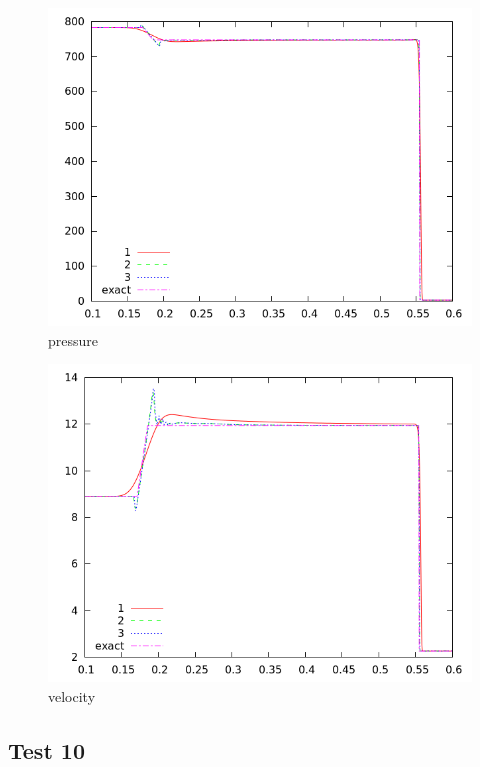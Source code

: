 \documentclass[10pt,preprint]{aastex}
\begin{document}
\begin{figure}
  \begin{center}
     \includegraphics[width=.78\textwidth]{prs_T9.png}	
  \end{center}
  \caption{pressure}
\end{figure}

\begin{figure}
  \begin{center}
     \includegraphics[width=.78\textwidth]{vel_T9.png}	
  \end{center}
  \caption{velocity}
\end{figure}
\clearpage

\subsection{Test 10}
\end{document}
